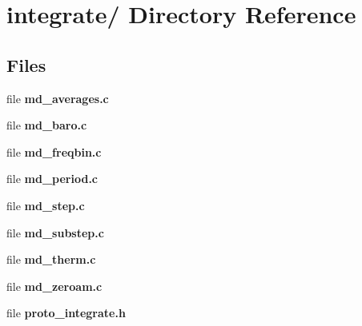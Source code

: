 \section{integrate/ Directory Reference}
\label{dir_f43c79f1a0a9e6a95301ab6786e7cbe8}
\subsection*{Files}
\begin{CompactItemize}
\item 
file {\bf md\_\-averages.c}
\item 
file {\bf md\_\-baro.c}
\item 
file {\bf md\_\-freqbin.c}
\item 
file {\bf md\_\-period.c}
\item 
file {\bf md\_\-step.c}
\item 
file {\bf md\_\-substep.c}
\item 
file {\bf md\_\-therm.c}
\item 
file {\bf md\_\-zeroam.c}
\item 
file {\bf proto\_\-integrate.h}
\end{CompactItemize}
